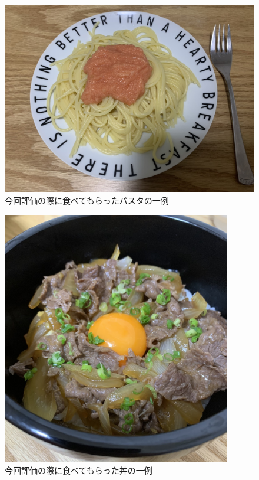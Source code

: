 \begin{figure}[htbp]
  \caption{今回評価の際に食べてもらったパスタの一例}
  \label{fig:experiment_food2}
  \begin{center}
    \includegraphics[bb=0 0 1450 1200,width=15cm]{assets/experiment_food2.jpg}
  \end{center}
\end{figure}

\begin{figure}[htbp]
  \caption{今回評価の際に食べてもらった丼の一例}
  \label{fig:experiment_food3}
  \begin{center}
    \includegraphics[bb=0 0 1000 1200,width=10cm]{assets/experiment_food3.jpg}
  \end{center}
\end{figure}

